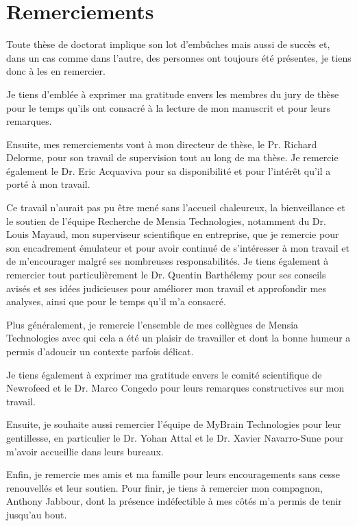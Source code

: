 \chapter*{Remerciements}

Toute thèse de doctorat implique son lot d'embûches mais aussi de succès et, dans un cas comme dans l'autre, des personnes ont toujours 
été présentes, je tiens donc à les en remercier. 

Je tiens d'emblée à exprimer ma gratitude envers les membres du jury de thèse pour le temps qu'ils ont consacré à la lecture de mon manuscrit et pour leurs 
remarques.

Ensuite, mes remerciements vont à mon directeur de thèse, le Pr. Richard Delorme, pour son travail de supervision tout au long
de ma thèse. Je remercie également le Dr. Eric Acquaviva pour sa disponibilité et pour l'intérêt qu'il a porté à mon travail. 

Ce travail n'aurait pas pu être mené sans l'accueil chaleureux, la bienveillance et le soutien de l'équipe Recherche de Mensia Technologies, notamment  
du Dr. Louis Mayaud, mon superviseur scientifique en entreprise, que je remercie pour son encadrement émulateur et 
pour avoir continué de s'intéresser à mon travail et de m'encourager malgré ses nombreuses
responsabilités. Je tiens également à remercier tout particulièrement le Dr. Quentin Barthélemy pour ses conseils 
avisés et ses idées judicieuses pour améliorer mon travail et approfondir mes analyses, ainsi que pour le temps qu'il m'a consacré. 

Plus généralement, je remercie l'ensemble de mes collègues de Mensia Technologies avec qui cela a été un plaisir de travailler et dont la bonne 
humeur a permis d'adoucir un contexte parfois délicat.

Je tiens également à exprimer ma gratitude envers le comité scientifique de Newrofeed et le Dr. Marco Congedo pour leurs remarques constructives sur mon travail. 

Ensuite, je souhaite aussi remercier l'équipe de MyBrain Technologies pour leur gentillesse, en particulier le Dr. Yohan Attal et le Dr. Xavier Navarro-Sune 
pour m'avoir accueillie dans leurs bureaux. 

Enfin, je remercie mes amis et ma famille pour leurs encouragements sans cesse renouvellés et leur soutien. Pour finir, je tiens à remercier 
mon compagnon, Anthony Jabbour, dont la présence indéfectible à mes côtés m'a permis de tenir jusqu'au bout.     